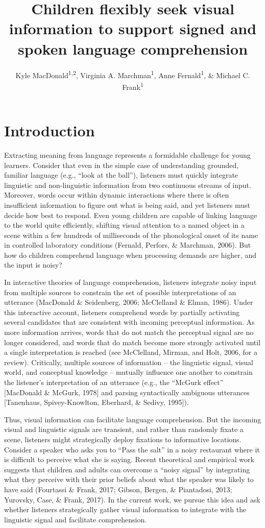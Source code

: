 \documentclass[,man,floatsintext]{apa6}
\title{Children flexibly seek visual information to support signed and spoken language comprehension}
\author{Kyle MacDonald\textsuperscript{1,2}, Virginia A. Marchman\textsuperscript{1}, Anne Fernald\textsuperscript{1}, \& Michael C. Frank\textsuperscript{1}}
\date{}
\affiliation{
\vspace{0.5cm}
\textsuperscript{1} Stanford University\\\textsuperscript{2} University of California, Los Angeles}
\begin{document}
\maketitle

\hypertarget{introduction}{%
\section{Introduction}\label{introduction}}

Extracting meaning from language represents a formidable challenge for young learners. Consider that even in the simple case of understanding grounded, familiar language (e.g., \enquote{look at the ball}), listeners must quickly integrate linguistic and non-linguistic information from two continuous streams of input. Moreover, words occur within dynamic interactions where there is often insufficient information to figure out what is being said, and yet listeners must decide how best to respond. Even young children are capable of linking language to the world quite efficiently, shifting visual attention to a named object in a scene within a few hundreds of milliseconds of the phonological onset of its name in controlled laboratory conditions (Fernald, Perfors, \& Marchman, 2006). But how do children comprehend language when processing demands are higher, and the input is noisy?

In interactive theories of language comprehension, listeners integrate noisy input from multiple sources to constrain the set of possible interpretations of an utterance (MacDonald \& Seidenberg, 2006; McClelland \& Elman, 1986). Under this interactive account, listeners comprehend words by partially activating several candidates that are consistent with incoming perceptual information. As more information arrives, words that do not match the perceptual signal are no longer considered, and words that do match become more strongly activated until a single interpretation is reached (see McClelland, Mirman, and Holt, 2006, for a review). Critically, multiple sources of information -- the linguistic signal, visual world, and conceptual knowledge -- mutually influence one another to constrain the listener's interpretation of an utterance (e.g., the \enquote{McGurk effect} {[}MacDonald \& McGurk, 1978{]} and parsing syntactically ambiguous utterances {[}Tanenhaus, Spivey-Knowlton, Eberhard, \& Sedivy, 1995{]}).

Thus, visual information can facilitate language comprehension. But the incoming visual and linguistic signals are transient, and rather than randomly fixate a scene, listeners might strategically deploy fixations to informative locations. Consider a speaker who asks you to \enquote{Pass the salt} in a noisy restaurant where it is difficult to perceive what she is saying. Recent theoretical and empirical work suggests that children and adults can overcome a \enquote{noisy signal} by integrating what they perceive with their prior beliefs about what the speaker was likely to have said (Fourtassi \& Frank, 2017; Gibson, Bergen, \& Piantadosi, 2013; Yurovsky, Case, \& Frank, 2017). In the current work, we pursue this idea and ask whether listeners strategically gather visual information to integrate with the linguistic signal and facilitate comprehension.
\end{document}
